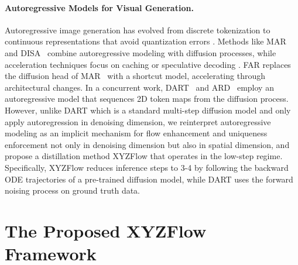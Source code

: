 \documentclass{article}
\theoremstyle{plain}
\theoremstyle{definition}
\theoremstyle{remark}
\begin{document}
\paragraph{Autoregressive Models for Visual Generation.}
Autoregressive image generation has evolved from discrete tokenization \cite{vqvae2,vqgan,lee2022autoregressive} to continuous representations that avoid quantization errors \cite{mar,ren2024flowar,xar,harmon}. Methods like MAR~\cite{mar} and DISA~\cite{zhao2025disa} combine autoregressive modeling with diffusion processes, while acceleration techniques focus on caching \cite{lazymar} or speculative decoding \cite{speculative_mar}. FAR \cite{far} replaces the diffusion head of MAR~\cite{mar} with a shortcut model, accelerating through architectural changes. In a concurrent work, DART~\cite{gu2024dartdenoisingautoregressivetransformer} and ARD~\cite{kim2025autoregressive} employ an autoregressive model that sequences 2D token maps from the diffusion process. However, unlike DART which is a standard multi-step diffusion model and only apply autoregression in denoising dimension, we reinterpret autoregressive modeling as an implicit mechanism for flow enhancement and uniqueness enforcement not only in denoising dimension but also in spatial dimension, and propose a distillation method XYZFlow that operates in the low-step regime. Specifically, XYZFlow reduces inference steps to 3-4 by following the backward ODE trajectories of a pre-trained diffusion model, while DART uses the forward noising process on ground truth data. 



\vspace{-2mm}
\section{The Proposed XYZFlow Framework}
\label{sec:methodology}
% 
\end{document}
